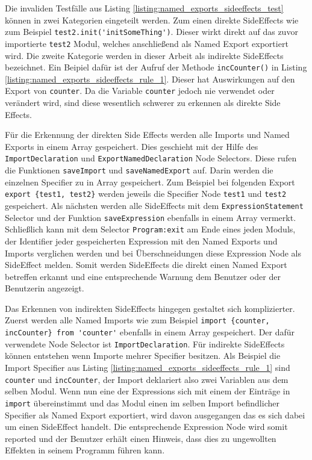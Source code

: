 Die invaliden Testfälle aus Listing \ref{listing:named_exports_sideeffects_test} können in zwei Kategorien eingeteilt werden. Zum einen direkte SideEffects wie zum Beispiel \lstinline{test2.init('initSomeThing')}. Dieser wirkt direkt auf das zuvor importierte \lstinline{test2} Modul, welches anschließend als Named Export exportiert wird. Die zweite Kategorie werden in dieser Arbeit als indirekte SideEffects bezeichnet. Ein Beipiel dafür ist der Aufruf der Methode \lstinline{incCounter()} in Listing \ref{listing:named_exports_sideeffects_rule_1}. Dieser hat Auswirkungen auf den Export von \lstinline{counter}. Da die Variable \lstinline{counter} jedoch nie verwendet oder verändert wird, sind diese wesentlich schwerer zu erkennen als direkte Side Effects. 

Für die Erkennung der direkten Side Effects werden alle Imports und Named Exports in einem Array gespeichert. Dies geschieht mit der Hilfe des \lstinline{ImportDeclaration} und \lstinline{ExportNamedDeclaration} Node Selectors. Diese rufen die Funktionen \lstinline{saveImport}  und \lstinline{saveNamedExport} auf. Darin werden die einzelnen Specifier zu in Array gespeichert. Zum Beispiel bei folgenden Export \lstinline|export {test1, test2}| werden jeweils die Specifier Node \lstinline{test1} und \lstinline{test2} gespeichert. Als nächsten werden alle SideEffects mit dem \lstinline{ExpressionStatement} Selector und der Funktion \lstinline{saveExpression} ebenfalls in einem Array vermerkt. Schließlich kann mit dem Selector \lstinline{Program:exit} am Ende eines jeden Moduls, der Identifier jeder gespeicherten Expression mit den Named Exports und Imports verglichen werden und bei Überschneidungen diese Expression Node als SideEffect melden.
Somit werden SideEffects die direkt einen Named Export betreffen erkannt und eine entsprechende Warnung dem Benutzer oder der Benutzerin angezeigt.

Das Erkennen von indirekten SideEffects hingegen gestaltet sich komplizierter. Zuerst werden alle  Named Imports wie zum Beispiel \lstinline|import {counter, incCounter} from 'counter'| ebenfalls in einem Array gespeichert. Der dafür verwendete Node Selector ist \lstinline{ImportDeclaration}. 
Für indirekte SideEffects können entstehen wenn Importe mehrer Specifier besitzen. Als Beispiel die Import Specifier aus Listing \ref{listing:named_exports_sideeffects_rule_1} sind \lstinline{counter} und \lstinline{incCounter}, der Import deklariert also zwei Variablen aus dem selben Modul. Wenn nun eine der Expressions sich mit einem der Einträge in \lstinline{import} übereinstimmt und das Modul einen im selben Import befindlicher Specifier als Named Export exportiert, wird davon ausgegangen das es sich dabei um einen SideEffect handelt. Die entsprechende Expression Node wird somit reported und der Benutzer erhält einen Hinweis, dass dies zu ungewollten Effekten in seinem Programm führen kann.


